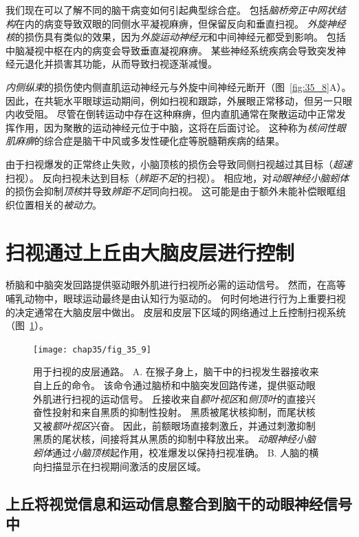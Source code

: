 我们现在可以了解不同的脑干病变如何引起典型综合症。
包括\textit{脑桥旁正中网状结构}在内的病变导致双眼的同侧水平凝视麻痹，但保留反向和垂直扫视。
\textit{外旋神经核}的损伤具有类似的效果，因为\textit{外旋运动神经元}和中间神经元都受到影响。
包括中脑凝视中枢在内的病变会导致垂直凝视麻痹。
某些神经系统疾病会导致突发神经元退化并损害其功能，从而导致扫视逐渐减慢。


\textit{内侧纵束}的损伤使内侧直肌运动神经元与外旋中间神经元断开（图~\ref{fig:35_8}A）。
因此，在共轭水平眼球运动期间，例如扫视和跟踪，外展眼正常移动，但另一只眼内收受阻。
尽管在倒转运动中存在这种麻痹，但内直肌通常在聚散运动中正常发挥作用，因为聚散的运动神经元位于中脑，这将在后面讨论。
这种称为\textit{核间性眼肌麻痹}的综合症是脑干中风或多发性硬化症等脱髓鞘疾病的结果。


由于扫视爆发的正常终止失败，小脑顶核的损伤会导致同侧扫视越过其目标（\textit{超速}扫视）。
反向扫视未达到目标（\textit{辨距不足}的扫视）。
相应地，对\textit{动眼神经小脑蚓体}的损伤会抑制\textit{顶核}并导致\textit{辨距不足}同向扫视。
这可能是由于额外未能补偿眼眶组织位置相关的\textit{被动力}。



\section{扫视通过上丘由大脑皮层进行控制}

桥脑和中脑突发回路提供驱动眼外肌进行扫视所必需的运动信号。
然而，在高等哺乳动物中，眼球运动最终是由认知行为驱动的。
何时何地进行行为上重要扫视的决定通常在大脑皮层中做出。
皮层和皮层下区域的网络通过上丘控制扫视系统（图~\ref{fig:35_9}）。


\begin{figure}[htbp]
	\centering
	\texttt{[image: chap35/fig\_35\_9]}
	\caption{用于扫视的皮层通路。
		A. 在猴子身上，脑干中的扫视发生器接收来自上丘的命令。
		该命令通过脑桥和中脑突发回路传递，提供驱动眼外肌进行扫视的运动信号。
		丘接收来自\textit{额叶视区}和\textit{侧顶叶}的直接兴奋性投射和来自黑质的抑制性投射。
		黑质被尾状核抑制，而尾状核又被\textit{额叶视区}兴奋。
		因此，前额眼场直接刺激丘，并通过刺激抑制黑质的尾状核，间接将其从黑质的抑制中释放出来。
		\textit{动眼神经小脑蚓体}通过\textit{小脑顶核}起作用，校准爆发以保持扫视准确。
		B. 人脑的横向扫描显示在扫视期间激活的皮层区域\cite{curtis2008saccade}。}
	\label{fig:35_9}
\end{figure}



\subsection{上丘将视觉信息和运动信息整合到脑干的动眼神经信号中}

